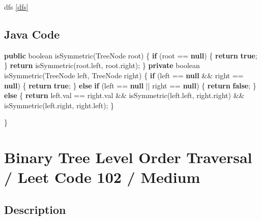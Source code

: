\documentclass[]{book}
\newenvironment{Shaded}{\begin{snugshade}}{\end{snugshade}}
\newcommand{\BuiltInTok}[1]{#1}
\newcommand{\DataTypeTok}[1]{\textcolor[rgb]{0.13,0.29,0.53}{#1}}
\newcommand{\FunctionTok}[1]{\textcolor[rgb]{0.00,0.00,0.00}{#1}}
\newcommand{\KeywordTok}[1]{\textcolor[rgb]{0.13,0.29,0.53}{\textbf{#1}}}
\newcommand{\NormalTok}[1]{#1}
\begin{document}
dfs \ref{dfs}

\hypertarget{java-code-42}{%
\subsection{Java Code}\label{java-code-42}}

\begin{Shaded}
\begin{Highlighting}[]
\KeywordTok{public} \DataTypeTok{boolean} \FunctionTok{isSymmetric}\NormalTok{(}\BuiltInTok{TreeNode}\NormalTok{ root) \{}
    \KeywordTok{if}\NormalTok{ (root == }\KeywordTok{null}\NormalTok{) \{}
        \KeywordTok{return} \KeywordTok{true}\NormalTok{;}
\NormalTok{    \}}
    \KeywordTok{return} \FunctionTok{isSymmetric}\NormalTok{(root.}\FunctionTok{left}\NormalTok{, root.}\FunctionTok{right}\NormalTok{);}
\NormalTok{\}}
\KeywordTok{private} \DataTypeTok{boolean} \FunctionTok{isSymmetric}\NormalTok{(}\BuiltInTok{TreeNode}\NormalTok{ left, }\BuiltInTok{TreeNode}\NormalTok{ right) \{}
    \KeywordTok{if}\NormalTok{ (left == }\KeywordTok{null}\NormalTok{ && right == }\KeywordTok{null}\NormalTok{) \{}
        \KeywordTok{return} \KeywordTok{true}\NormalTok{;}
\NormalTok{    \} }\KeywordTok{else} \KeywordTok{if}\NormalTok{ (left == }\KeywordTok{null}\NormalTok{ || right == }\KeywordTok{null}\NormalTok{) \{}
        \KeywordTok{return} \KeywordTok{false}\NormalTok{;}
\NormalTok{    \} }\KeywordTok{else}\NormalTok{ \{}
        \KeywordTok{return}\NormalTok{ left.}\FunctionTok{val}\NormalTok{ == right.}\FunctionTok{val}\NormalTok{ && }\FunctionTok{isSymmetric}\NormalTok{(left.}\FunctionTok{left}\NormalTok{, right.}\FunctionTok{right}\NormalTok{)}
\NormalTok{&& }\FunctionTok{isSymmetric}\NormalTok{(left.}\FunctionTok{right}\NormalTok{, right.}\FunctionTok{left}\NormalTok{);}
\NormalTok{    \}}

\NormalTok{\}}
\end{Highlighting}
\end{Shaded}

\hypertarget{binary-tree-level-order-traversal-leet-code-102-medium}{%
\section{Binary Tree Level Order Traversal / Leet Code 102 / Medium}\label{binary-tree-level-order-traversal-leet-code-102-medium}}

\hypertarget{description-54}{%
\subsection{Description}\label{description-54}}
\end{document}

